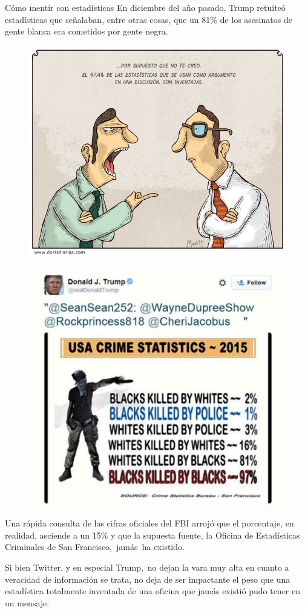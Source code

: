 \begin{myexampleblock}{Cómo mentir con estadísticas}
\vspace{2mm} En diciembre del año pasado, Trump retuiteó estadísticas que señalaban, entre otras cosas, que un 81\% de los asesinatos de gente blanca era cometidos por gente negra.

\begin{multicols}{2}
	\begin{figure}[H]
			\centering
			\includegraphics[width=.5\textwidth]{imagenes/imagenes01/T01IM30.png}
	\end{figure}
	
	\begin{figure}[H]
			\centering
			\includegraphics[width=.5\textwidth]{imagenes/imagenes01/T01IM31.png}
	\end{figure}
\end{multicols}


\vspace{2mm} Una rápida consulta de las cifras oficiales del FBI arrojó que el porcentaje, en realidad, asciende a un 15\% y que la supuesta fuente, la Oficina de Estadísticas Criminales de San Francisco, jamás ha existido.

\vspace{2mm} Si bien Twitter, y en especial Trump, no dejan la vara muy alta en cuanto a veracidad de información se trata, no deja de ser impactante el peso que una estadística totalmente inventada de una oficina que jamás existió pudo tener en un mensaje.


\end{myexampleblock}
